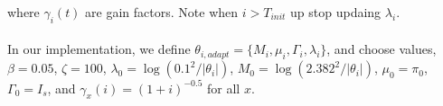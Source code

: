 \documentclass{article}
\begin{document}
 where $ \gamma_i(t)$ are gain factors. Note when $i > T_{init}$ up stop updaing $\lambda_i$.
 
 
\paragraph{}In our implementation, we define $\theta_{i, adapt} = \{M_i, \mu_i, \Gamma_i, \lambda_i\}$, and choose values, $\beta = 0.05$, $\zeta = 100$,  $\lambda_0 = \log(0.1^2/|\theta_i|)$, $M_0 = \log(2.382^2/|\theta_i|)$,  $\mu_0 = \pi_0$,  $\Gamma_0 = I_s$, and $\gamma_x(i) = (1 + i)^{-0.5}$ for all $x$. 
\end{document}
